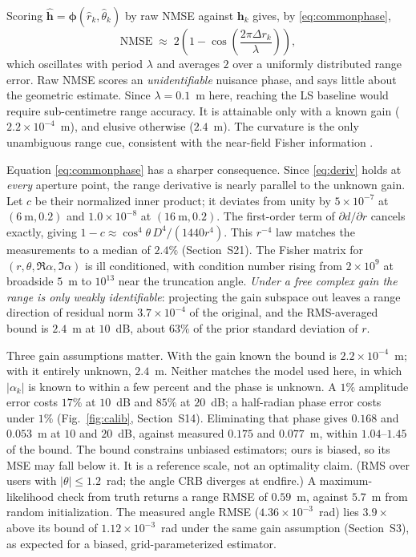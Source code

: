 \documentclass[journal]{IEEEtran}
\begin{document}
Scoring $\widehat{\mathbf{h}} = \bm{\phi}(\hat r_k, \hat\theta_k)$ by raw NMSE against $\mathbf{h}_k$ gives, by \eqref{eq:commonphase},
\begin{equation}
\mathrm{NMSE} \;\approx\; 2\left(1 - \cos\!\left(\frac{2\pi \Delta r_k}{\lambda}\right)\right),
\label{eq:nmseosc}
\end{equation}
which oscillates with period $\lambda$ and averages $2$ over a uniformly distributed range error. Raw NMSE scores an \emph{unidentifiable} nuisance phase, and says little about the geometric estimate. Since $\lambda = 0.1$~m here, reaching the LS baseline would require sub-centimetre range accuracy. It is attainable only with a known gain ($2.2\times10^{-4}$~m), and elusive otherwise ($2.4$~m). The curvature is the only unambiguous range cue, consistent with the near-field Fisher information \cite{crb,crbnf}.

Equation \eqref{eq:commonphase} has a sharper consequence. Since \eqref{eq:deriv} holds at \emph{every} aperture point, the range derivative is nearly parallel to the unknown gain. Let $c$ be their normalized inner product; it deviates from unity by $5\times10^{-7}$ at $(6~\mathrm{m},0.2)$ and $1.0\times10^{-8}$ at $(16~\mathrm{m},0.2)$. The first-order term of $\partial d/\partial r$ cancels exactly, giving $1-c\approx\cos^4\theta\,D^4/(1440r^4)$. This $r^{-4}$ law matches the measurements to a median of $2.4\%$ (Section~S21). The Fisher matrix for $(r, \theta, \Re\alpha, \Im\alpha)$ is ill conditioned, with condition number rising from $2\times10^{9}$ at broadside $5$~m to $10^{13}$ near the truncation angle. \emph{Under a free complex gain the range is only weakly identifiable}: projecting the gain subspace out leaves a range direction of residual norm $3.7\times10^{-4}$ of the original, and the RMS-averaged bound is $2.4$~m at $10$~dB, about $63\%$ of the prior standard deviation of $r$.

Three gain assumptions matter. With the gain known the bound is $2.2\times10^{-4}$~m; with it entirely unknown, $2.4$~m. Neither matches the model used here, in which $|\alpha_k|$ is known to within a few percent and the phase is unknown. A $1\%$ amplitude error costs $17\%$ at $10$~dB and $85\%$ at $20$~dB; a half-radian phase error costs under $1\%$ (Fig.~\ref{fig:calib}, Section~S14). Eliminating that phase gives $0.168$ and $0.053$~m at $10$ and $20$~dB, against measured $0.175$ and $0.077$~m, within $1.04$--$1.45$ of the bound. The bound constrains unbiased estimators; ours is biased, so its MSE may fall below it. It is a reference scale, not an optimality claim. (RMS over users with $|\theta| \le 1.2$~rad; the angle CRB diverges at endfire.) A maximum-likelihood check from truth returns a range RMSE of $0.59$~m, against $5.7$~m from random initialization. The measured angle RMSE ($4.36\times10^{-3}$~rad) lies $3.9\times$ above its bound of $1.12\times10^{-3}$~rad under the same gain assumption (Section~S3), as expected for a biased, grid-parameterized estimator.
\end{document}
